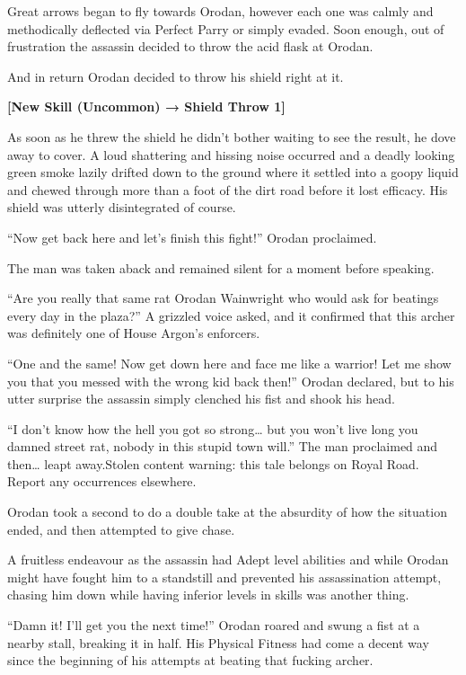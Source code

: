 \documentclass[a4paper,10pt]{book}
\begin{document}
Great arrows began to fly towards Orodan, however each one was calmly and methodically deflected via Perfect Parry or simply evaded. Soon enough, out of frustration the assassin decided to throw the acid flask at Orodan.\par
And in return Orodan decided to throw his shield right at it.\par
\textbf{[New Skill (Uncommon) → Shield Throw 1]}\par
As soon as he threw the shield he didn’t bother waiting to see the result, he dove away to cover. A loud shattering and hissing noise occurred and a deadly looking green smoke lazily drifted down to the ground where it settled into a goopy liquid and chewed through more than a foot of the dirt road before it lost efficacy. His shield was utterly disintegrated of course.\par
“Now get back here and let’s finish this fight!” Orodan proclaimed.\par
The man was taken aback and remained silent for a moment before speaking.\par
“Are you really that same rat Orodan Wainwright who would ask for beatings every day in the plaza?” A grizzled voice asked, and it confirmed that this archer was definitely one of House Argon’s enforcers.\par
“One and the same! Now get down here and face me like a warrior! Let me show you that you messed with the wrong kid back then!” Orodan declared, but to his utter surprise the assassin simply clenched his fist and shook his head.\par
“I don’t know how the hell you got so strong… but you won’t live long you damned street rat, nobody in this stupid town will.” The man proclaimed and then… leapt away.Stolen content warning: this tale belongs on Royal Road. Report any occurrences elsewhere.\par
Orodan took a second to do a double take at the absurdity of how the situation ended, and then attempted to give chase.\par
A fruitless endeavour as the assassin had Adept level abilities and while Orodan might have fought him to a standstill and prevented his assassination attempt, chasing him down while having inferior levels in skills was another thing.\par
“Damn it! I’ll get you the next time!” Orodan roared and swung a fist at a nearby stall, breaking it in half. His Physical Fitness had come a decent way since the beginning of his attempts at beating that fucking archer.\par
\end{document}
